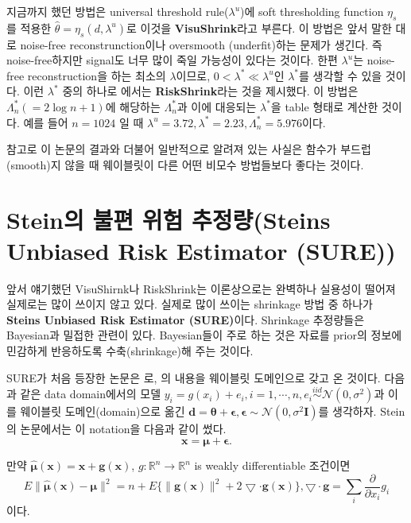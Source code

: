 \documentclass[b5paper,]{scrbook}
\theoremstyle{plain}
\theoremstyle{definition}
\numberwithin{equation}{section}
\let\BeginKnitrBlock\begin \let\EndKnitrBlock\end
\begin{document}
지금까지 했던 방법은 universal threshold rule(\(\lambda^{u}\))에 soft thresholding function \(\eta_{s}\)를 적용한 \(\hat{\theta}=\eta_{s}(d,\lambda^{u})\)로 이것을 \textbf{VisuShrink}라고 부른다. 이 방법은 앞서 말한 대로 noise-free reconstrunction이나 oversmooth (underfit)하는 문제가 생긴다. 즉 noise-free하지만 signal도 너무 많이 죽일 가능성이 있다는 것이다. 한편 \(\lambda^{u}\)는 noise-free reconstruction을 하는 최소의 \(\lambda\)이므로, \(0< \lambda^{*} \ll \lambda^{u}\)인 \(\lambda^{*}\)를 생각할 수 있을 것이다. 이런 \(\lambda^{*}\) 중의 하나로 \citep{Donoho1994}에서는 \textbf{RiskShrink}라는 것을 제시했다. 이 방법은 \(\Lambda_{n}^{*}(=2 \log n +1)\)에 해당하는 \(\Lambda_{n}^{*}\)과 이에 대응되는 \(\lambda^{*}\)을 table 형태로 계산한 것이다. 예를 들어 \(n=1024\) 일 때 \(\lambda^{u}=3.72, \lambda^{*}=2.23, \Lambda_{n}^{*}=5.976\)이다.

참고로 이 논문의 결과와 더불어 일반적으로 알려져 있는 사실은 함수가 부드럽(smooth)지 않을 때 웨이블릿이 다른 어떤 비모수 방법들보다 좋다는 것이다.

\hypertarget{stein---steins-unbiased-risk-estimator-sure}{%
\section{Stein의 불편 위험 추정량(Steins Unbiased Risk Estimator (SURE))}\label{stein---steins-unbiased-risk-estimator-sure}}

앞서 얘기했던 VisuShirnk나 RiskShrink는 이론상으로는 완벽하나 실용성이 떨어져 실제로는 많이 쓰이지 않고 있다. 실제로 많이 쓰이는 shrinkage 방법 중 하나가 \textbf{Steins Unbiased Risk Estimator (SURE)}이다. Shrinkage 추정량들은 Bayesian과 밀접한 관련이 있다. Bayesian들이 주로 하는 것은 자료를 prior의 정보에 민감하게 반응하도록 수축(shrinkage)해 주는 것이다.

SURE가 처음 등장한 논문은 \citep{Donoho1995}로, \citep{Stein1981}의 내용을 웨이블릿 도메인으로 갖고 온 것이다. 다음과 같은 data domain에서의 모델 \(y_{i}=g(x_{i})+e_{i}, i=1,\cdots,n,e_{i} \stackrel{iid}{\sim} \mathcal{N}(0,\sigma^{2})\)과 이를 웨이블릿 도메인(domain)으로 옮긴 \(\mathbf{d}=\boldsymbol{\theta}+\boldsymbol{\epsilon}, \boldsymbol{\epsilon} \sim \mathcal{N}(0,\sigma^{2}\mathbf{I})\)를 생각하자. Stein의 논문에서는 이 notation을 다음과 같이 썼다.
\[\mathbf{x}=\boldsymbol{\mu}+\boldsymbol{\epsilon}.\]

\BeginKnitrBlock{theorem}[Stein]
\protect\hypertarget{thm:unnamed-chunk-310}{}{\label{thm:unnamed-chunk-310} {} }\citep{Stein1981} 만약 \(\hat{\boldsymbol{\mu}}\mathbf{(x)}=\mathbf{x}+\mathbf{g(x)}\), \(g:\mathbb{R}^{n} \rightarrow \mathbb{R}^{n}\) is weakly differentiable 조건이면
\[E \| \hat{\boldsymbol{\mu}}\mathbf{(x)}-\boldsymbol{\mu} \|^{2} =n+ E\{ \|\mathbf{g(x)}\|^{2}+2\bigtriangledown \cdot \mathbf{g(x)} \}, \bigtriangledown\cdot \mathbf{g}=\sum_{i} \frac{\partial}{\partial x_{i}}g_{i}\]
이다.
\EndKnitrBlock{theorem}
\end{document}
